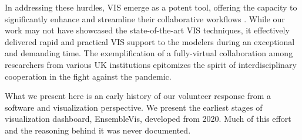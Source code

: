 In addressing these hurdles, \ac{VIS} emerge as a potent tool, offering the capacity to significantly enhance and streamline their collaborative workflows \cite{swallow2022Challenges}.
While our work may not have showcased the state-of-the-art VIS techniques, it effectively delivered rapid and practical VIS support to the modelers during an exceptional and demanding time.
The exemplification of a fully-virtual collaboration among researchers from various UK institutions epitomizes the spirit of interdisciplinary cooperation in the fight against the pandemic.

What we present here is an early history of our volunteer response from a software and visualization perspective. We present the earliest stages of visualization dashboard, EnsembleVis, developed from 2020. Much of this effort and the reasoning behind it was never documented.
